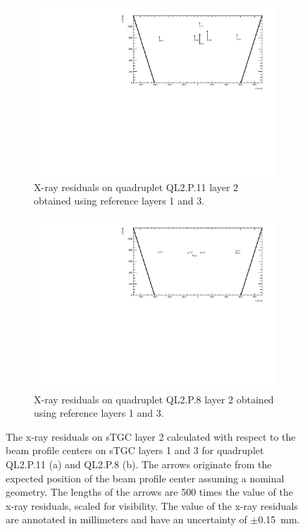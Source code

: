 \newpage
\thispagestyle{empty}
\begin{figure}
\centering
\begin{subfigure}{\textwidth}
  \centering
  \includegraphics[width=\linewidth]{figures/QL2P11_xray_residuals_layer2_fixedlayers13.pdf}
  \caption{X-ray residuals on quadruplet QL2.P.11 layer 2 obtained using reference layers 1 and 3.}
  \label{fig:xray_res_th2_ql2p11}
\end{subfigure}%
\vspace*{\floatsep}
\begin{subfigure}{\textwidth}
  \centering
  \includegraphics[width=\linewidth]{figures/QL2P08_xray_residuals_layer2_fixedlayers13.pdf}
  \caption{X-ray residuals on quadruplet QL2.P.8 layer 2 obtained using reference layers 1 and 3.}
  \label{fig:xray_res_th2_ql2p8}
\end{subfigure}
\caption{The x-ray residuals on sTGC layer 2 calculated with respect to the beam profile centers on sTGC layers 1 and 3 for quadruplet QL2.P.11 (a) and QL2.P.8 (b). The arrows originate from the expected position of the beam profile center assuming a nominal geometry. The lengths of the arrows are 500 times the value of the x-ray residuals, scaled for visibility. The value of the x-ray residuals are annotated in millimeters and have an uncertainty of $\pm$\SI{0.15}{mm}.}
\label{fig:xray_res_th2}
\end{figure}
\newpage
\restoregeometry

